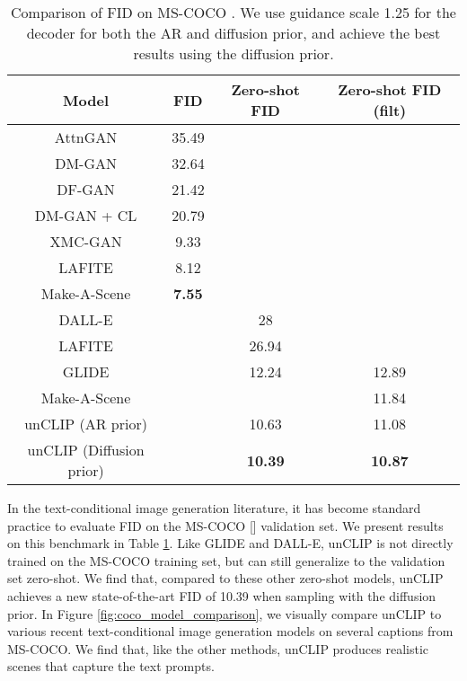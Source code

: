 \documentclass{article}
\newcommand{\shortcite}[1]{[\citenum{#1}]}
\newcommand{\modelname}{unCLIP}
\begin{document}
\begin{table}[t]
    \centering
    \begin{center}
    \begin{small}
    \begin{tabular}{cccc}
    \toprule
    Model & FID & Zero-shot FID & Zero-shot FID (filt) \\
    \midrule
    AttnGAN \citep{attngan} & 35.49 & & \\
    DM-GAN \citep{dmgan} & 32.64 & & \\
    DF-GAN \citep{dfgan} & 21.42 & & \\
    DM-GAN + CL \citep{textcl} & 20.79 & & \\
    XMC-GAN \citep{xmcgan} & 9.33 & & \\
    LAFITE \citep{lafite} & 8.12 & & \\
    Make-A-Scene \citep{makeascene} & \textbf{7.55} & & \\
    \midrule
    DALL-E \citep{dalle} & &  28 & \\
    LAFITE \citep{lafite} & & 26.94 & \\
    GLIDE \citep{glide} & & 12.24 & 12.89 \\
    Make-A-Scene \citep{makeascene} & & & 11.84 \\
    \modelname{} (AR prior) & & 10.63 & 11.08 \\
    \modelname{} (Diffusion prior) & & \textbf{10.39} & \textbf{10.87} \\
    \bottomrule
    \end{tabular}
    \end{small}
    \end{center}
    \caption{\label{tab:mscoco_fids} Comparison of FID on MS-COCO . We use guidance scale 1.25 for the decoder for both the AR and diffusion prior, and achieve the best results using the diffusion prior.}
    \vskip -0.2in
\end{table}

In the text-conditional image generation literature, it has become standard practice to evaluate FID on the MS-COCO \shortcite{mscoco} validation set. We present results on this benchmark in Table \ref{tab:mscoco_fids}. Like GLIDE and DALL-E, \modelname{} is not directly trained on the MS-COCO training set, but can still generalize to the validation set zero-shot. We find that, compared to these other zero-shot models, \modelname{} achieves a new state-of-the-art FID of 10.39 when sampling with the diffusion prior. In Figure \ref{fig:coco_model_comparison}, we visually compare \modelname{} to various recent text-conditional image generation models on several captions from MS-COCO. We find that, like the other methods, \modelname{} produces realistic scenes that capture the text prompts.
\end{document}
